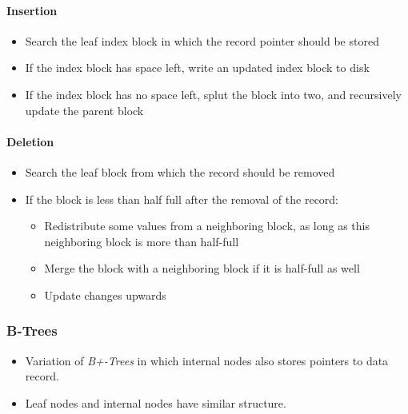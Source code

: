 \begin{minipage}[t]{0.48\textwidth}
\paragraph{Insertion}
\begin{itemize}
    \item Search the leaf index block in which the record pointer should be stored
    \item If the index block has space left, write an updated index block to disk
    \item If the index block has no space left, splut the block into two, and recursively update the parent block
\end{itemize}
\end{minipage}
\hfill
\begin{minipage}[t]{0.48\textwidth}
\paragraph{Deletion}
\begin{itemize}
    \item Search the leaf block from which the record should be removed
    \item If the block is less than half full after the removal of the record:
    \begin{itemize}
        \item Redistribute some values from a neighboring block, as long as this neighboring block is more than half-full
        \item Merge the block with a neighboring block if it is half-full as well
        \item Update changes upwards
    \end{itemize}
\end{itemize}
\end{minipage}

\subsubsection{B-Trees}

\begin{itemize}
    \item Variation of \textit{B+-Trees} in which internal nodes also stores pointers to data record.
    \item Leaf nodes and internal nodes have similar structure.
\end{itemize}

